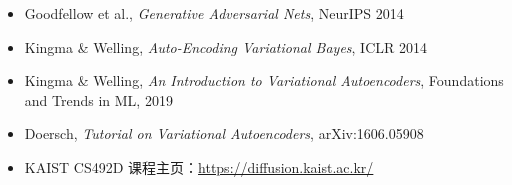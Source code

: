 \documentclass[a4paper]{article}
\begin{document}
\begin{itemize}
    \item Goodfellow et al., \textit{Generative Adversarial Nets}, NeurIPS 2014
    \item Kingma \& Welling, \textit{Auto-Encoding Variational Bayes}, ICLR 2014
    \item Kingma \& Welling, \textit{An Introduction to Variational Autoencoders}, Foundations and Trends in ML, 2019
    \item Doersch, \textit{Tutorial on Variational Autoencoders}, arXiv:1606.05908
    \item KAIST CS492D 课程主页：\url{https://diffusion.kaist.ac.kr/}
\end{itemize}

\end{document}

